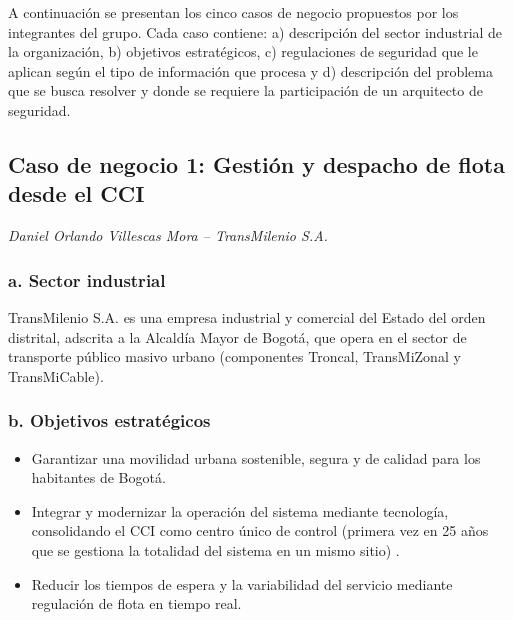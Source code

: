 
A continuación se presentan los cinco casos de negocio propuestos por los integrantes del grupo. Cada caso contiene: a) descripción del sector industrial de la organización, b) objetivos estratégicos, c) regulaciones de seguridad que le aplican según el tipo de información que procesa y d) descripción del problema que se busca resolver y donde se requiere la participación de un arquitecto de seguridad.

\subsection{Caso de negocio 1: Gestión y despacho de flota desde el CCI}

\textit{Daniel Orlando Villescas Mora -- TransMilenio S.A.}

\subsubsection*{a. Sector industrial}

TransMilenio S.A. es una empresa industrial y comercial del Estado del orden distrital, adscrita a la Alcaldía Mayor de Bogotá, que opera en el sector de transporte público masivo urbano (componentes Troncal, TransMiZonal y TransMiCable).

\subsubsection*{b. Objetivos estratégicos}

\begin{itemize}
	\item Garantizar una movilidad urbana sostenible, segura y de calidad para los habitantes de Bogotá.
	\item Integrar y modernizar la operación del sistema mediante tecnología, consolidando el CCI como centro único de control (primera vez en 25 años que se gestiona la totalidad del sistema en un mismo sitio) \parencite{transmilenio2026cci,alcaldia2026cci}.
	\item Reducir los tiempos de espera y la variabilidad del servicio mediante regulación de flota en tiempo real.
\end{itemize}

